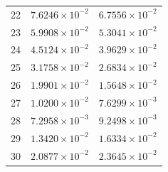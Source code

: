 \begin{table}[H]
\begin{tabular}{@{}rrr@{}}
22 & $7.6246\times10^{-2}$ & $6.7556\times10^{-2}$\\
23 & $5.9908\times10^{-2}$ & $5.3041\times10^{-2}$\\
24 & $4.5124\times10^{-2}$ & $3.9629\times10^{-2}$\\
25 & $3.1758\times10^{-2}$ & $2.6834\times10^{-2}$\\
26 & $1.9901\times10^{-2}$ & $1.5648\times10^{-2}$\\
27 & $1.0200\times10^{-2}$ & $7.6299\times10^{-3}$\\
28 & $7.2958\times10^{-3}$ & $9.2498\times10^{-3}$\\
29 & $1.3420\times10^{-2}$ & $1.6334\times10^{-2}$\\
30 & $2.0877\times10^{-2}$ & $2.3645\times10^{-2}$\\
\bottomrule
\end{tabular}
\end{table}

